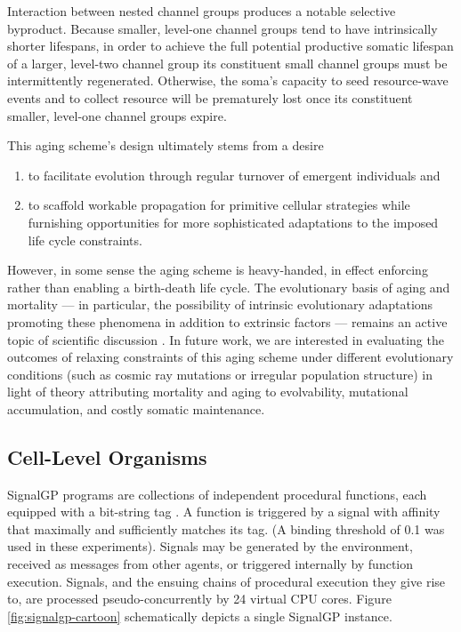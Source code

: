 Interaction between nested channel groups produces a notable selective byproduct.
Because smaller, level-one channel groups tend to have intrinsically shorter lifespans, in order to achieve the full potential productive somatic lifespan of a larger, level-two channel group its constituent small channel groups must be intermittently regenerated.
Otherwise, the soma's capacity to seed resource-wave events and to collect resource will be prematurely lost once its constituent smaller, level-one channel groups expire.

This aging scheme's design ultimately stems from a desire
\begin{enumerate}
\item to facilitate evolution through regular turnover of emergent individuals and
\item to scaffold workable propagation for primitive cellular strategies while furnishing opportunities for more sophisticated adaptations to the imposed life cycle constraints.
\end{enumerate}
However, in some sense the aging scheme is heavy-handed, in effect enforcing rather than enabling a birth-death life cycle.
The evolutionary basis of aging and mortality --- in particular, the possibility of intrinsic evolutionary adaptations promoting these phenomena in addition to extrinsic factors  --- remains an active topic of scientific discussion \cite{baig2014evolution}.
In future work, we are interested in evaluating the outcomes of relaxing constraints of this aging scheme under different evolutionary conditions (such as cosmic ray mutations or irregular population structure) in light of theory attributing mortality and aging to evolvability, mutational accumulation, and costly somatic maintenance.

\subsection{Cell-Level Organisms} \label{sup:cell_level_organisms}



SignalGP programs are collections of independent procedural functions, each equipped with a bit-string tag \cite{lalejini2018evolving}.
A function is triggered by a signal with affinity that maximally and sufficiently matches its tag.
(A binding threshold of 0.1 was used in these experiments).
Signals may be generated by the environment, received as messages from other agents, or triggered internally by function execution.
Signals, and the ensuing chains of procedural execution they give rise to, are processed pseudo-concurrently by 24 virtual CPU cores.
Figure \ref{fig:signalgp-cartoon} schematically depicts a single SignalGP instance.

